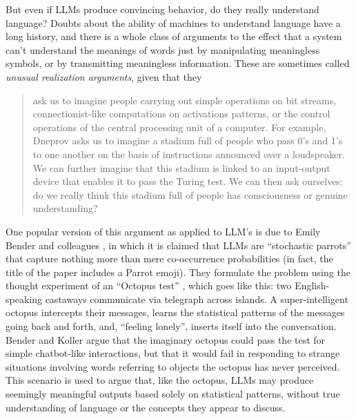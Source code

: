 But even if LLMs produce convincing behavior, do they really understand language? Doubts about the ability of machines to understand language have a long history, and there is a whole class of arguments to the effect that a system can’t understand the meanings of words just by manipulating meaningless symbols, or by transmitting meaningless information. These are sometimes called \emph{unusual realization arguments}, given that they
\begin{quote}
ask us to imagine people carrying out simple operations on bit streams, connectionist-like computations on activations patterns, or the control operations of the central processing unit of a computer. For example, Dneprov asks us to imagine a stadium full of people who pass 0’s and 1’s to one another on the basis of instructions announced over a loudspeaker. We can further imagine that this stadium is linked to an input-output device that enables it to pass the Turing test. We can then ask ourselves: do we really think this stadium full of people has consciousness or genuine understanding? \cite{noelle2022artificial}
\end{quote}


 One popular version of this argument as applied to LLM's is due to Emily Bender and colleagues \cite{bender2021dangers}, in which it is claimed that LLMs are ``stochastic parrots'' that capture nothing more than mere co-occurrence probabilities (in fact, the title of the paper includes a Parrot emoji). They formulate the problem using the thought experiment of an ``Octopus test'' \cite{bender2020climbing}, which goes like this: two English-speaking castaways communicate via telegraph across islands. A super-intelligent octopus intercepts their messages, learns the statistical patterns of the messages going back and forth, and, ``feeling lonely'', inserts itself into the conversation. Bender and Koller argue that the imaginary octopus could pass the test for simple chatbot-like interactions, but that it would fail in responding to strange situations involving words referring to objects the octopus has never perceived. This scenario is used to argue that, like the octopus, LLMs may produce seemingly meaningful outputs based solely on statistical patterns, without true understanding of language or the concepts they appear to discuss.

